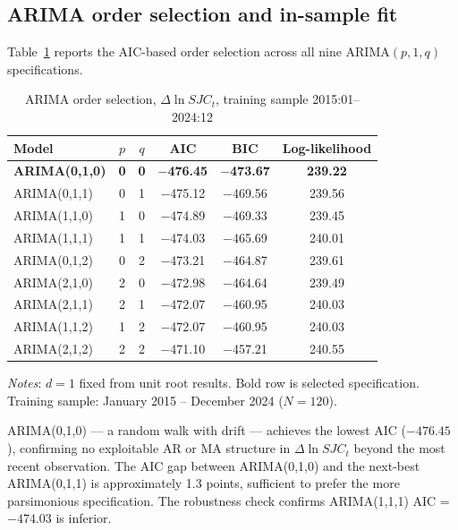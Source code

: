 \documentclass[12pt,a4paper]{article}
\begin{document}
\subsection{ARIMA order selection and in-sample fit}

Table~\ref{tab:arima} reports the AIC-based order selection across all
nine ARIMA$(p,1,q)$ specifications.

\begin{table}[H]
\caption{ARIMA order selection, $\Delta\ln SJC_t$, training sample 2015:01--2024:12}
\label{tab:arima}
\centering
\small
\begin{tabular}{lccccc}
\toprule
Model & $p$ & $q$ & AIC & BIC & Log-likelihood \\
\midrule
\textbf{ARIMA(0,1,0)} & \textbf{0} & \textbf{0} & \textbf{$-$476.45} & \textbf{$-$473.67} & \textbf{239.22} \\
ARIMA(0,1,1) & 0 & 1 & $-$475.12 & $-$469.56 & 239.56 \\
ARIMA(1,1,0) & 1 & 0 & $-$474.89 & $-$469.33 & 239.45 \\
ARIMA(1,1,1) & 1 & 1 & $-$474.03 & $-$465.69 & 240.01 \\
ARIMA(0,1,2) & 0 & 2 & $-$473.21 & $-$464.87 & 239.61 \\
ARIMA(2,1,0) & 2 & 0 & $-$472.98 & $-$464.64 & 239.49 \\
ARIMA(2,1,1) & 2 & 1 & $-$472.07 & $-$460.95 & 240.03 \\
ARIMA(1,1,2) & 1 & 2 & $-$472.07 & $-$460.95 & 240.03 \\
ARIMA(2,1,2) & 2 & 2 & $-$471.10 & $-$457.21 & 240.55 \\
\bottomrule
\end{tabular}
\begin{minipage}{\linewidth}
\vspace{4pt}
\footnotesize
\textit{Notes}: $d = 1$ fixed from unit root results.
Bold row is selected specification.
Training sample: January 2015 -- December 2024 ($N = 120$).
\end{minipage}
\end{table}

ARIMA(0,1,0) --- a random walk with drift --- achieves the lowest AIC
($-476.45$), confirming no exploitable AR or MA structure in
$\Delta\ln SJC_t$ beyond the most recent observation. The AIC gap
between ARIMA(0,1,0) and the next-best ARIMA(0,1,1) is approximately
1.3 points, sufficient to prefer the more parsimonious specification.
The robustness check confirms ARIMA(1,1,1) AIC = $-474.03$ is inferior.
\end{document}
